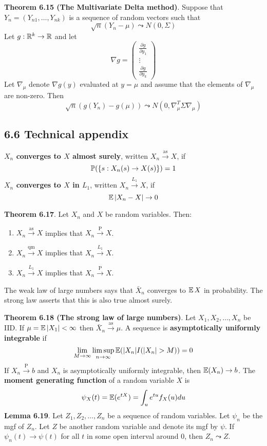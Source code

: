\textbf{Theorem 6.15 (The Multivariate Delta method)}. Suppose that
\(Y_{n} = (Y_{n1}, \dots, Y_{nk})\) is a sequence of random vectors such
that
\[
\sqrt{n}(Y_{n} - \mu) \leadsto N(0, \Sigma)
\]
Let \(g : \mathbb{R}^{k} \rightarrow \mathbb{R}\) and let
\[
\nabla g = \begin{pmatrix} \frac{\partial g}{\partial y_{1}} \\ \vdots \\  \frac{\partial g}{\partial y_{k}} \end{pmatrix}
\]
Let \(\nabla_\mu\) denote \(\nabla g(y)\) evaluated at \(y = \mu\) and
assume that the elements of \(\nabla_\mu\) are non-zero. Then
\[
\sqrt{n}(g(Y_{n}) - g(\mu)) \leadsto N(0, \nabla_\mu^T \Sigma \nabla_\mu)
\]

\subsection*{6.6 Technical appendix}
\textbf{\(X_{n}\) converges to \(X\) almost surely}, written
\(X_{n} \xrightarrow{\text{as}} X\), if
\[
\operatorname{\mathbb{P}}(\{s : X_{n}(s) \rightarrow X(s)\}) = 1
\]
\textbf{\(X_{n}\) converges to \(X\) in \(L_{1}\)}, written
\(X_{n} \xrightarrow{L_{1}} X\), if
\[
\operatorname{\mathbb{E}} |X_{n} - X| \rightarrow 0
\]

\textbf{Theorem 6.17}. Let \(X_{n}\) and \(X\) be random variables. Then:
\begin{enumerate}[tightlist,label={\arabic*.}]
\item
  \(X_{n} \xrightarrow{\text{as}} X\) implies that
  \(X_{n} \xrightarrow{\textrm{P}} X\).
\item
  \(X_{n} \xrightarrow{\text{qm}} X\) implies that
  \(X_{n} \xrightarrow{L_{1}} X\).
\item
  \(X_{n} \xrightarrow{L_{1}} X\) implies that
  \(X_{n} \xrightarrow{\textrm{P}} X\).
\end{enumerate}
The weak law of large numbers says that \(\bar{X}_{n}\) converges to
\(\operatorname{\mathbb{E}} X\) in probability. The strong law asserts that this is
also true almost surely.

\textbf{Theorem 6.18 (The strong law of large numbers)}. Let
\(X_{1}, X_{2}, \dots, X_{n}\) be IID. If \(\mu = \operatorname{\mathbb{E}}|X_{1}| < \infty\)
then \(\bar{X}_{n} \xrightarrow{\text{as}} \mu\).
A sequence is \textbf{asymptotically uniformly integrable} if
\[
\lim _{M \rightarrow \infty} \limsup _{n \rightarrow \infty} \operatorname{\mathbb{E}} ( |X_{n}| I(|X_{n}| > M) ) = 0
\]
If \(X_{n} \xrightarrow{\textrm{P}} b\) and \(X_{n}\) is asymptotically
uniformly integrable, then \(\operatorname{\mathbb{E}}(X_{n}) \rightarrow b\).
The \textbf{moment generating function} of a random variable \(X\) is
\[
\psi_X(t) = \operatorname{\mathbb{E}}(e^{tX}) = \int_u e^{tu} f_X(u) du
\]
\textbf{Lemma 6.19}. Let \(Z_{1}, Z_{2}, \dots, Z_{n}\) be a sequence of
random variables. Let \(\psi_{n}\) be the mgf of \(Z_{n}\). Let \(Z\) be
another random variable and denote its mgf by \(\psi\). If
\(\psi_{n}(t) \rightarrow \psi(t)\) for all \(t\) in some open interval
around 0, then \(Z_{n} \leadsto Z\).
